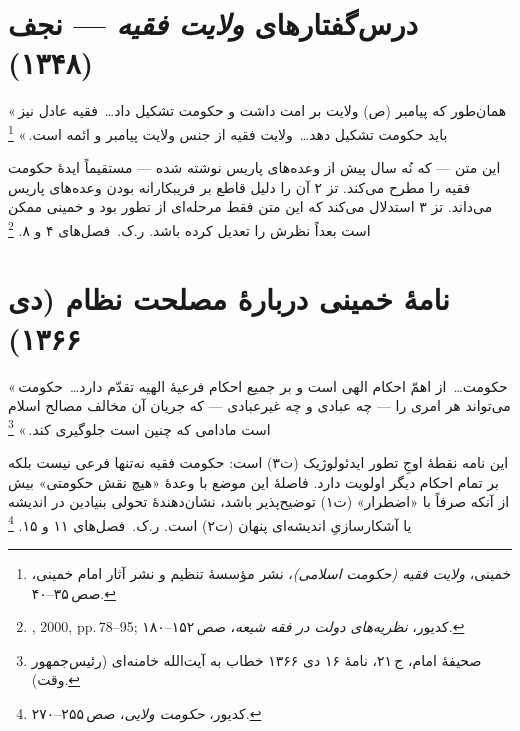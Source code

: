 \section{درس‌گفتارهای \textit{ولایت فقیه} — نجف (۱۳۴۸)}
\label{sec:app-b-velayat}

\begin{warningBox}
«\,همان‌طور که پیامبر (ص) ولایت بر امت داشت
و حکومت تشکیل داد\dots\
فقیه عادل نیز باید حکومت تشکیل دهد\dots\
ولایت فقیه از جنس ولایت پیامبر و ائمه است.\,»%
\footnote{خمینی، \textit{ولایت فقیه (حکومت اسلامی)}،
نشر مؤسسهٔ تنظیم و نشر آثار امام خمینی، صص\,۳۵–۴۰.}
\end{warningBox}

\begin{noteBox}
این متن — که نُه سال پیش از وعده‌های پاریس نوشته شده —
مستقیماً ایدهٔ حکومت فقیه را مطرح می‌کند.
تز ۲ آن را دلیل قاطع بر فریبکارانه بودن وعده‌های پاریس می‌داند.
تز ۳ استدلال می‌کند که این متن فقط مرحله‌ای از تطور بود
و خمینی ممکن است بعداً نظرش را تعدیل کرده باشد.
ر.ک.\ فصل‌های ۴ و ۸.%
\footnote{\en{Martin}, 2000, pp.\,78–95;
کدیور، \textit{نظریه‌های دولت در فقه شیعه}، صص\,۱۵۲–۱۸۰.}
\end{noteBox}

\section{نامهٔ خمینی دربارهٔ مصلحت نظام (دی ۱۳۶۶)}
\label{sec:app-b-maslahat}

\begin{warningBox}
«\,حکومت\dots\ از اهمّ احکام الهی است
و بر جمیع احکام فرعیهٔ الهیه تقدّم دارد\dots\
حکومت می‌تواند هر امری را — چه عبادی و چه غیرعبادی —
که جریان آن مخالف مصالح اسلام است
مادامی که چنین است جلوگیری کند.\,»%
\footnote{صحیفهٔ امام، ج\,۲۱، نامهٔ ۱۶ دی ۱۳۶۶
خطاب به آیت‌الله خامنه‌ای (رئیس‌جمهور وقت).}
\end{warningBox}

\begin{noteBox}
این نامه نقطهٔ اوجِ تطور ایدئولوژیک (ت‌۳) است:
حکومت فقیه نه‌تنها فرعی نیست
بلکه بر تمام احکام دیگر اولویت دارد.
فاصلهٔ این موضع با وعدهٔ «هیچ نقش حکومتی»
بیش از آنکه صرفاً با «اضطرار» (ت‌۱) توضیح‌پذیر باشد،
نشان‌دهندهٔ تحولی بنیادین در اندیشه یا
آشکارسازیِ اندیشه‌ای پنهان (ت‌۲) است.
ر.ک.\ فصل‌های ۱۱ و ۱۵.%
\footnote{کدیور، \textit{حکومت ولایی}، صص\,۲۵۵–۲۷۰.}
\end{noteBox}

